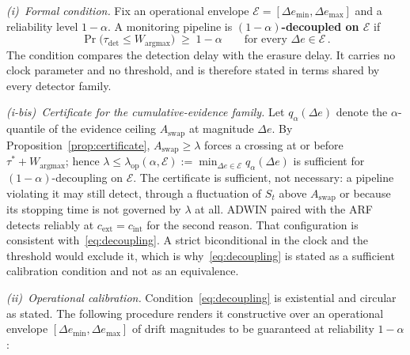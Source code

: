 \documentclass[smallextended]{svjour3}
\begin{document}
\begin{definition}\label{def:decoupling}

  \smallskip
  \emph{(i)~Formal condition.} Fix an operational envelope $\mathcal{E} = [\Delta e_{\min}, \Delta e_{\max}]$ and a reliability level $1-\alpha$. A monitoring pipeline is \textbf{$(1-\alpha)$-decoupled on $\mathcal{E}$} if
  \begin{equation}\label{eq:decoupling}
    \Pr\bigl(\tau_{\mathrm{det}} \le W_{\mathrm{argmax}}\bigr) \;\ge\; 1-\alpha
    \qquad \text{for every } \Delta e \in \mathcal{E}\,.
  \end{equation}
  The condition compares the detection delay with the erasure delay. It carries no clock parameter and no threshold, and is therefore stated in terms shared by every detector family.

  \smallskip
  \emph{(i-bis)~Certificate for the cumulative-evidence family.} Let $q_\alpha(\Delta e)$ denote the $\alpha$-quantile of the evidence ceiling $A_{\mathrm{swap}}$ at magnitude $\Delta e$. By Proposition~\ref{prop:certificate}, $A_{\mathrm{swap}} \ge \lambda$ forces a crossing at or before $\tau^* + W_{\mathrm{argmax}}$; hence $\lambda \le \lambda_{\mathrm{op}}(\alpha, \mathcal{E}) := \min_{\Delta e \in \mathcal{E}} q_\alpha(\Delta e)$ is sufficient for $(1-\alpha)$-decoupling on $\mathcal{E}$. The certificate is sufficient, not necessary: a pipeline violating it may still detect, through a fluctuation of $S_t$ above $A_{\mathrm{swap}}$ or because its stopping time is not governed by $\lambda$ at all. ADWIN paired with the ARF detects reliably at $c_{\mathrm{ext}} = c_{\mathrm{int}}$ for the second reason. That configuration is consistent with~\eqref{eq:decoupling}. A strict biconditional in the clock and the threshold would exclude it, which is why~\eqref{eq:decoupling} is stated as a sufficient calibration condition and not as an equivalence.

  \smallskip
  \emph{(ii)~Operational calibration.} Condition~\eqref{eq:decoupling} is existential and circular as stated. The following procedure renders it constructive over an operational envelope $[\Delta e_{\min}, \Delta e_{\max}]$ of drift magnitudes to be guaranteed at reliability $1-\alpha$:


\end{definition}
\end{document}
